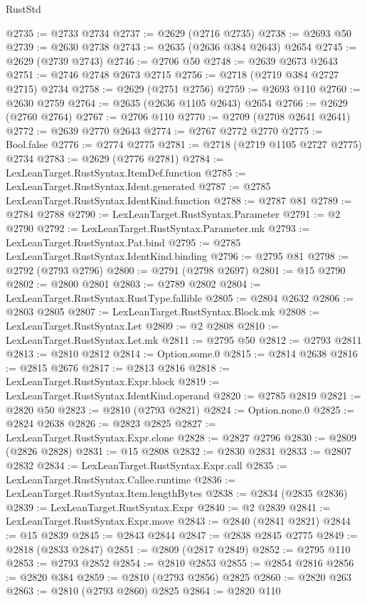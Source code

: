 \begin{lexlean}{RustStd}
\begin{coremodule}
@2735 := @2733 @2734
@2737 := @2629 (@2716 @2735)
@2738 := @2693 @50
@2739 := @2630 @2738
@2743 := @2635 (@2636 @384 @2643) @2654
@2745 := @2629 (@2739 @2743)
@2746 := @2706 @50
@2748 := @2639 @2673 @2643
@2751 := @2746 @2748 @2673 @2715
@2756 := @2718 (@2719 @384 @2727 @2715) @2734
@2758 := @2629 (@2751 @2756)
@2759 := @2693 @110
@2760 := @2630 @2759
@2764 := @2635 (@2636 @1105 @2643) @2654
@2766 := @2629 (@2760 @2764)
@2767 := @2706 @110
@2770 := @2709 (@2708 @2641 @2641)
@2772 := @2639 @2770 @2643
@2774 := @2767 @2772 @2770
@2775 := Bool.false
@2776 := @2774 @2775
@2781 := @2718 (@2719 @1105 @2727 @2775) @2734
@2783 := @2629 (@2776 @2781)
@2784 := LexLeanTarget.RustSyntax.ItemDef.function
@2785 := LexLeanTarget.RustSyntax.Ident.generated
@2787 := @2785 LexLeanTarget.RustSyntax.IdentKind.function
@2788 := @2787 @81
@2789 := @2784 @2788
@2790 := LexLeanTarget.RustSyntax.Parameter
@2791 := @2 @2790
@2792 := LexLeanTarget.RustSyntax.Parameter.mk
@2793 := LexLeanTarget.RustSyntax.Pat.bind
@2795 := @2785 LexLeanTarget.RustSyntax.IdentKind.binding
@2796 := @2795 @81
@2798 := @2792 (@2793 @2796)
@2800 := @2791 (@2798 @2697)
@2801 := @15 @2790
@2802 := @2800 @2801
@2803 := @2789 @2802
@2804 := LexLeanTarget.RustSyntax.RustType.fallible
@2805 := @2804 @2632
@2806 := @2803 @2805
@2807 := LexLeanTarget.RustSyntax.Block.mk
@2808 := LexLeanTarget.RustSyntax.Let
@2809 := @2 @2808
@2810 := LexLeanTarget.RustSyntax.Let.mk
@2811 := @2795 @50
@2812 := @2793 @2811
@2813 := @2810 @2812
@2814 := Option.some.{0}
@2815 := @2814 @2638
@2816 := @2815 @2676
@2817 := @2813 @2816
@2818 := LexLeanTarget.RustSyntax.Expr.block
@2819 := LexLeanTarget.RustSyntax.IdentKind.operand
@2820 := @2785 @2819
@2821 := @2820 @50
@2823 := @2810 (@2793 @2821)
@2824 := Option.none.{0}
@2825 := @2824 @2638
@2826 := @2823 @2825
@2827 := LexLeanTarget.RustSyntax.Expr.clone
@2828 := @2827 @2796
@2830 := @2809 (@2826 @2828)
@2831 := @15 @2808
@2832 := @2830 @2831
@2833 := @2807 @2832
@2834 := LexLeanTarget.RustSyntax.Expr.call
@2835 := LexLeanTarget.RustSyntax.Callee.runtime
@2836 := LexLeanTarget.RustSyntax.Item.lengthBytes
@2838 := @2834 (@2835 @2836)
@2839 := LexLeanTarget.RustSyntax.Expr
@2840 := @2 @2839
@2841 := LexLeanTarget.RustSyntax.Expr.move
@2843 := @2840 (@2841 @2821)
@2844 := @15 @2839
@2845 := @2843 @2844
@2847 := @2838 @2845 @2775
@2849 := @2818 (@2833 @2847)
@2851 := @2809 (@2817 @2849)
@2852 := @2795 @110
@2853 := @2793 @2852
@2854 := @2810 @2853
@2855 := @2854 @2816
@2856 := @2820 @384
@2859 := @2810 (@2793 @2856) @2825
@2860 := @2820 @263
@2863 := @2810 (@2793 @2860) @2825
@2864 := @2820 @110

\end{coremodule}
\end{lexlean}

